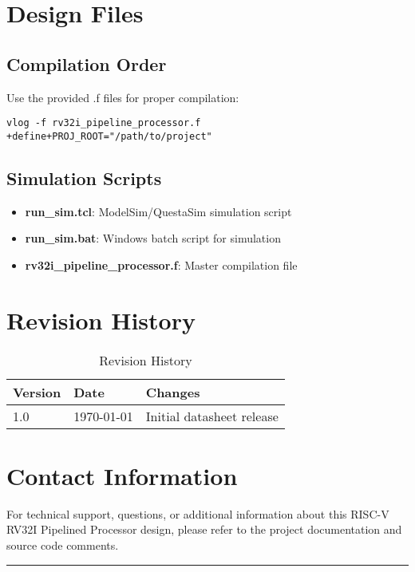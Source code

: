 \documentclass[11pt,a4paper]{article}
\begin{document}
\section{Design Files}

\subsection{Compilation Order}
Use the provided .f files for proper compilation:

\begin{lstlisting}[caption=Compilation Command Example]
vlog -f rv32i_pipeline_processor.f +define+PROJ_ROOT="/path/to/project"
\end{lstlisting}

\subsection{Simulation Scripts}
\begin{itemize}
    \item \textbf{run\_sim.tcl}: ModelSim/QuestaSim simulation script
    \item \textbf{run\_sim.bat}: Windows batch script for simulation
    \item \textbf{rv32i\_pipeline\_processor.f}: Master compilation file
\end{itemize}

\section{Revision History}

\begin{table}[h]
\centering
\begin{tabular}{|l|l|l|}
\hline
\textbf{Version} & \textbf{Date} & \textbf{Changes} \\
\hline
1.0 & \today & Initial datasheet release \\
\hline
\end{tabular}
\caption{Revision History}
\end{table}

\section{Contact Information}

For technical support, questions, or additional information about this RISC-V RV32I Pipelined Processor design, please refer to the project documentation and source code comments.

\vfill
\hrule
\vspace{0.5cm}
\end{document}
